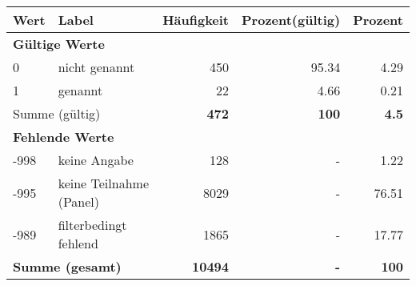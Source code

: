      \begin{longtable}{lXrrr}
     \toprule
     \textbf{Wert} & \textbf{Label} & \textbf{Häufigkeit} & \textbf{Prozent(gültig)} & \textbf{Prozent} \\
     \endhead
     \midrule
     \multicolumn{5}{l}{\textbf{Gültige Werte}}\\

     0 &
     \multicolumn{1}{X}{ nicht genannt   } &


       \num{450} &
       \num[round-mode=places,round-precision=2]{95.34} &
         \num[round-mode=places,round-precision=2]{4.29} \\

     1 &
     \multicolumn{1}{X}{ genannt   } &


       \num{22} &
       \num[round-mode=places,round-precision=2]{4.66} &
         \num[round-mode=places,round-precision=2]{0.21} \\
     \midrule
     \multicolumn{2}{l}{Summe (gültig)} &
       \textbf{\num{472}} &
     \textbf{\num{100}} &
       \textbf{\num[round-mode=places,round-precision=2]{4.5}} \\
     \multicolumn{5}{l}{\textbf{Fehlende Werte}}\\
       -998 &
       keine Angabe &
         \num{128} &
        - &
         \num[round-mode=places,round-precision=2]{1.22} \\
       -995 &
       keine Teilnahme (Panel) &
         \num{8029} &
        - &
         \num[round-mode=places,round-precision=2]{76.51} \\
       -989 &
       filterbedingt fehlend &
         \num{1865} &
        - &
         \num[round-mode=places,round-precision=2]{17.77} \\
     \midrule
     \multicolumn{2}{l}{\textbf{Summe (gesamt)}} &
          \textbf{\num{10494}} &
        \textbf{-} &
        \textbf{\num{100}} \\
     \bottomrule
     \end{longtable}
     
